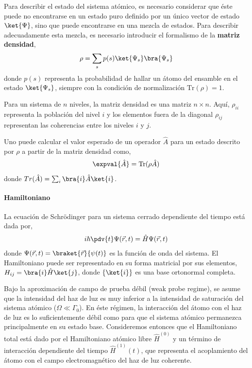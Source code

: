 Para describir el estado del sistema atómico, es necesario considerar que éste puede no encontrarse en un estado puro definido por un único vector de estado $\ket{\Psi}$, sino que puede encontrarse en una mezcla de estados. Para describir adecuadamente esta mezcla, es necesario introducir el formalismo de la \textbf{matriz densidad},
\begin{equation}
    \rho = \sum_s p(s) \ket{\Psi_s}\bra{\Psi_s}
\end{equation}
donde $p(s)$ representa la probabilidad de hallar un átomo del ensamble en el estado $\ket{\Psi_s}$, siempre con la condición de normalización $\text{Tr}(\rho) = 1$.

Para un sistema de $n$ niveles, la matriz densidad es una matriz $n \times n$. Aquí, $\rho_{ii}$ representa la población del nivel $i$ y los elementos fuera de la diagonal $\rho_{ij}$ representan las coherencias entre los niveles $i$ y $j$.

Uno puede calcular el valor esperado de un operador $\hat{A}$ para un estado descrito por $\rho$ a partir de la matriz densidad como,
\begin{equation}
    \expval{\hat{A}} = \text{Tr}(\rho \hat{A})
\end{equation}
donde $Tr(\hat{A}) = \sum_i \bra{i} \hat{A} \ket{i}$.
\paragraph{Hamiltoniano}
La ecuación de Schrödinger para un sistema cerrado dependiente del tiempo está dada por,
\begin{equation}
    i \hbar \pdv{t} \Psi(\vec{r}, t) = \hat{H} \Psi(\vec{r}, t)
\end{equation}
donde $ \Psi(\vec{r}, t) = \braket{\vec{r}}{\psi(t)}$ es la función de onda del sistema. El Hamiltoniano puede ser representado en su forma matricial por sus elementos, $H_{ij} = \bra{i} \hat{H} \ket{j}$, donde $\{\ket{i}\}$ es una base ortonormal completa.

Bajo la aproximación de campo de prueba débil (weak probe regime), se asume que la intensidad del haz de luz es muy inferior a la intensidad de saturación del sistema atómico ($\Omega \ll \Gamma_0$). En éste régimen, la interacción del átomo con el haz de luz es lo suficientemente débil como para que el sistema atómico permanezca principalmente en su estado base. Consideremos entonces que el Hamiltoniano total está dado por el Hamiltoniano atómico libre $\hat{H}^{(0)}$ y un término de interacción dependiente del tiempo $\hat{H}^{(1)}(t)$, que representa el acoplamiento del átomo con el campo electromagnético del haz de luz coherente.

